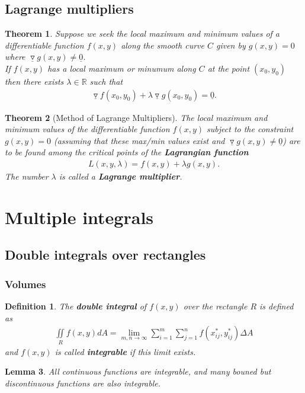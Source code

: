 \documentclass{article}
\theoremstyle{sltheorem}
\newtheorem{definition}{Definition}[section]
\newtheorem{theorem}{Theorem}[section]
\newtheorem{lemma}[theorem]{Lemma}
\newcommand{\R}{\mathbb{R}}
\newcommand{\grad}{\vec\triangledown}
\newcommand{\di}{\iint\limits}
\renewcommand{\vec}{\underline}
\newcommand*\B[1]{\textbf{#1}}
\begin{document}
\subsection{Lagrange multipliers}
\begin{theorem}
    Suppose we seek the local maximum and minimum values of a differentiable
    function $f(x,y)$ along the smooth curve $C$ given by $g(x,y)=0$ where
    $\grad g(x,y)\not=\vec 0$.\\
    If $f(x,y)$ has a local maximum or minumum along $C$ at the point
    $(x_0, y_0)$ then there exists $\lambda\in\R$ such that
    \begin{align*}
        \grad f(x_0, y_0) + \lambda\grad g(x_0, y_0) = \vec 0.
    \end{align*}
\end{theorem}
\begin{theorem}[Method of Lagrange Multipliers]
    The local maximum and minimum values of the differentiable function
    $f(x,y)$ subject to the constraint $g(x,y)=0$ (assuming that these
    max/min values exist and $\grad g(x,y)\not=\vec 0$) are to be found
    among the critical points of the \B{Lagrangian function}
    \begin{align*}
        L(x,y,\lambda)=f(x,y)+\lambda g(x,y).
    \end{align*} 
    The number $\lambda$ is called a \B{Lagrange multiplier}.
\end{theorem}
\section{Multiple integrals}
\subsection{Double integrals over rectangles}
\subsubsection{Volumes}
\begin{definition}
    The \B{double integral} of $f(x,y)$ over the rectangle $R$ is defined as
    \begin{align*}
        \di_R f(x,y)dA = \lim_{m,n\to\infty}\sum_{i=1}^m\sum_{j=1}^n f(x_{ij}^*, y_{ij}^*)\Delta A
    \end{align*}
    and $f(x,y)$ is called \B{integrable} if this limit exists.
\end{definition}
\begin{lemma}
    All continuous functions are integrable, and many bouned but
    discontinuous functions are also integrable.
\end{lemma}
\end{document}
